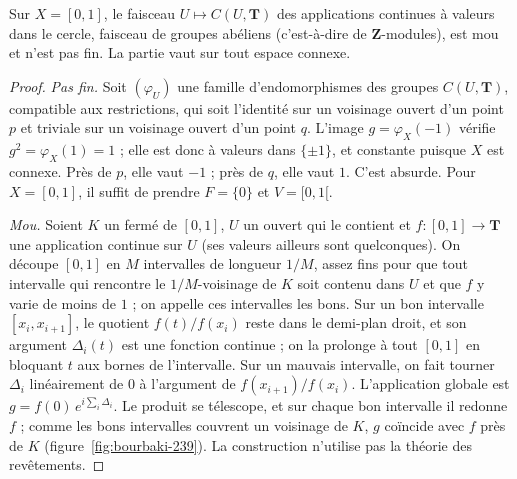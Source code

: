 \begin{encadre}
\begin{contrexemple}
Sur $X = [0, 1]$, le faisceau $U \mapsto C(U, \mathbf T)$ des applications continues à valeurs dans le cercle, faisceau de groupes abéliens (c'est-à-dire de $\mathbf Z$-modules), est mou et n'est pas fin. La partie  vaut sur tout espace connexe.
\end{contrexemple}
\end{encadre}

\begin{proof}
\emph{Pas fin.} Soit $(\varphi_U)$ une famille d'endomorphismes des groupes $C(U, \mathbf T)$, compatible aux restrictions, qui soit l'identité sur un voisinage ouvert d'un point $p$ et triviale sur un voisinage ouvert d'un point $q$. L'image $g = \varphi_X(-1)$ vérifie $g^2 = \varphi_X(1) = 1$ ; elle est donc à valeurs dans $\{\pm 1\}$, et constante puisque $X$ est connexe. Près de $p$, elle vaut $-1$ ; près de $q$, elle vaut $1$. C'est absurde. Pour $X = [0, 1]$, il suffit de prendre $F = \{0\}$ et $V = [0, 1[$.

\emph{Mou.} Soient $K$ un fermé de $[0, 1]$, $U$ un ouvert qui le contient et $f : [0, 1] \to \mathbf T$ une application continue sur $U$ (ses valeurs ailleurs sont quelconques). On découpe $[0, 1]$ en $M$ intervalles de longueur $1/M$, assez fins pour que tout intervalle qui rencontre le $1/M$-voisinage de $K$ soit contenu dans $U$ et que $f$ y varie de moins de $1$ ; on appelle ces intervalles les bons. Sur un bon intervalle $[x_i, x_{i+1}]$, le quotient $f(t)/f(x_i)$ reste dans le demi-plan droit, et son argument $\Delta_i(t)$ est une fonction continue ; on la prolonge à tout $[0, 1]$ en bloquant $t$ aux bornes de l'intervalle. Sur un mauvais intervalle, on fait tourner $\Delta_i$ linéairement de $0$ à l'argument de $f(x_{i+1})/f(x_i)$. L'application globale est $g = f(0)\, e^{i\sum_i \Delta_i}$. Le produit se télescope, et sur chaque bon intervalle il redonne $f$ ; comme les bons intervalles couvrent un voisinage de $K$, $g$ coïncide avec $f$ près de $K$ (figure~\ref{fig:bourbaki-239}). La construction n'utilise pas la théorie des revêtements.
\end{proof}

